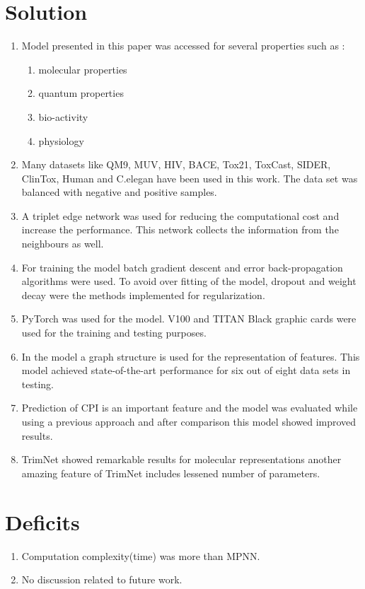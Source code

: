 \documentclass[12pt]{osa-supplemental-document}
\begin{document}
\section*{Solution}
\begin{enumerate}
    \item Model presented in this paper was accessed for several properties such as :
    \begin{enumerate}
     \item molecular properties
     \item  quantum properties
     \item bio-activity
     \item  physiology
    \end{enumerate}
\item Many datasets like QM9, MUV, HIV, BACE, Tox21, ToxCast, SIDER, ClinTox, Human and C.elegan have been used in this work. The data set was balanced with negative and positive samples. 
\item A triplet edge network was used for reducing the computational cost and increase the performance. This network collects the information from the neighbours as well.
\item For training the model batch gradient descent and error back-propagation algorithms were used. To avoid over fitting of the model, dropout and weight decay were the methods implemented for regularization. 
\item PyTorch was used for the model. V100 and TITAN Black graphic cards were used for the training and testing purposes. 
\item In the model a graph structure is used for the representation of features. This model achieved  state-of-the-art performance for six out of eight data sets in testing.
\item Prediction of CPI is an important feature and the model was evaluated while using a previous approach and after comparison this model showed improved results.  
\item TrimNet showed remarkable results for molecular representations another amazing feature of TrimNet includes lessened number of parameters. 
\end{enumerate}

\section*{Deficits}
\begin{enumerate}
\item Computation complexity(time) was more than MPNN.
\item No discussion related to future work. 
\end{enumerate}
\end{document}
